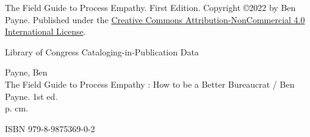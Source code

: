 \thispagestyle{empty}

\noindent The Field Guide to Process Empathy. First Edition. Copyright \copyright 2022 by Ben Payne. 
Published under the 
\href{https://creativecommons.org/licenses/by-nc/4.0/}{Creative Commons Attribution-NonCommercial 4.0 International License}.


\vspace*{\fill}



\noindent Library of Congress Cataloging-in-Publication Data

\noindent Payne, Ben\\
The Field Guide to Process Empathy : How to be a Better Bureaucrat / Ben Payne. 1st ed.\\
p. cm.

\noindent ISBN 979-8-9875369-0-2
